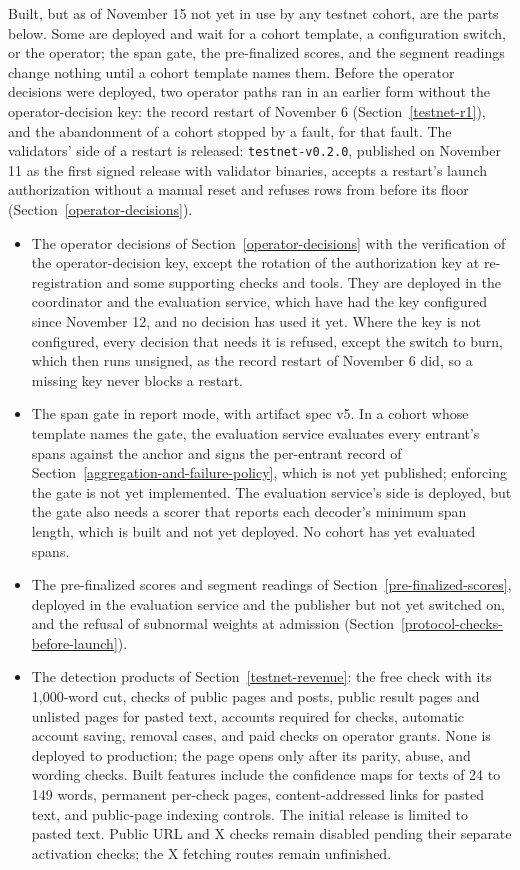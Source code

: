Built, but as of November 15 not yet in use by any testnet cohort, are the
parts below. Some are deployed and wait for a cohort template, a configuration
switch, or the operator; the span gate, the pre-finalized scores, and the
segment readings change nothing until a cohort template names them. Before the
operator decisions were deployed, two operator paths ran in an earlier form
without the operator-decision key: the record restart of November 6
(Section~\ref{testnet-r1}), and the abandonment of a cohort stopped by a fault,
for that fault. The validators' side of a restart is
released: \texttt{testnet-v0.2.0}, published on November 11 as the first signed
release with validator binaries, accepts a restart's launch authorization
without a manual reset and refuses rows from before its floor
(Section~\ref{operator-decisions}).
\begin{itemize}\tightlist
\item The operator decisions of Section~\ref{operator-decisions} with the
verification of the operator-decision key, except the rotation of the
authorization key at re-registration and some supporting checks and tools.
They are deployed in the coordinator and the evaluation service, which have
had the key configured since November 12, and no decision has used it yet.
Where the key is not configured, every decision that needs it is refused,
except the switch to burn, which then runs unsigned, as the record restart of
November 6 did, so a missing key never blocks a restart.
\item The span gate in report mode, with artifact spec v5. In a cohort whose
template names the gate, the evaluation service evaluates every entrant's
spans against the anchor and signs the per-entrant record of
Section~\ref{aggregation-and-failure-policy}, which is not yet published;
enforcing the gate is not yet implemented. The evaluation service's side is
deployed, but the gate also needs a scorer that reports each decoder's minimum
span length, which is built and not yet deployed. No cohort has yet evaluated
spans.
\item The pre-finalized scores and segment readings of
Section~\ref{pre-finalized-scores}, deployed in the evaluation service and the
publisher but not yet switched on, and the refusal of subnormal weights at
admission (Section~\ref{protocol-checks-before-launch}).
\item The detection products of Section~\ref{testnet-revenue}: the free
check with its 1,000-word cut, checks of public pages and posts, public result
pages and unlisted pages for pasted text, accounts required for checks, automatic account saving, removal cases, and paid checks on
operator grants. None is deployed to production; the page opens only after its
parity, abuse, and wording checks. Built features include the confidence
maps for texts of 24 to 149 words, permanent per-check pages, content-addressed
links for pasted text, and public-page indexing controls. The initial release
is limited to pasted text. Public URL and X checks remain disabled pending
their separate activation checks; the X fetching routes remain unfinished.
\end{itemize}

